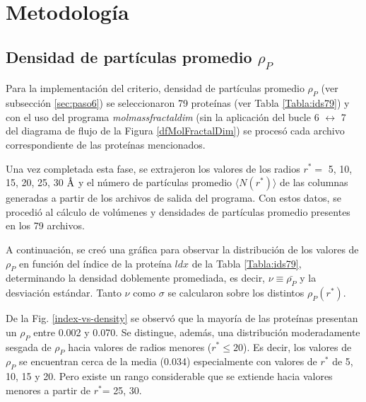  	
 	\section{Metodolog\'{i}a}
 	
 	\subsection{Densidad de partículas promedio $\rho_{P}$}
 	
 	Para la implementación del criterio, densidad de partículas 
 	promedio $\rho_{P}$ (ver subsección \ref{sec:paso6}) se seleccionaron 
 	79 proteínas (ver Tabla \ref{Tabla:ids79}) y con el uso del programa \emph{molmassfractaldim} (sin la aplicación del bucle 6 $\longleftrightarrow$ 7 del diagrama de flujo de la Figura \ref{dfMolFractalDim}) se procesó cada archivo correspondiente de las proteínas mencionados. 
 
 	Una vez completada esta fase, se extrajeron los valores de los radios $r^*{=}$ 5, 10, 15, 20, 25, 30 $\textup{\r{A}}$ y el número de partículas promedio $\langle N(r^{*}) \rangle$  de las columnas generadas a partir de los archivos de salida del programa. Con estos datos, se procedió al cálculo de volúmenes y densidades de partículas promedio presentes en los 79 archivos. 
 	
 	
 	A continuación, se creó una gráfica para observar la distribución de los valores de $\rho_{P}$ en funci\'{o}n del \'{i}ndice de la prote\'{i}na $ldx$ de la Tabla \ref{Tabla:ids79}, determinando la densidad doblemente promediada, es decir, $\nu\equiv\bar{\rho_P}$ y la desviaci\'{o}n est\'{a}ndar. Tanto $\nu$ como $\sigma$ se calcularon sobre los distintos $\rho_P(r^*)$.
 	
 	De la Fig. \ref{index-vs-density} se observó que la mayor\'{i}a de las prote\'{i}nas presentan un $\rho_P$ entre 0.002 y 0.070. 
 	Se distingue, además, una distribución moderadamente sesgada de $\rho_P$ hacia valores de radios menores ($r^* \leq 20$). Es decir, los valores de \(\rho_P\) se encuentran cerca de la media (0.034) especialmente con valores de $r^*$ de 5, 10, 15 y 20. Pero existe un rango considerable que se extiende hacia valores menores a partir de $r^*$= 25, 30.
 	
